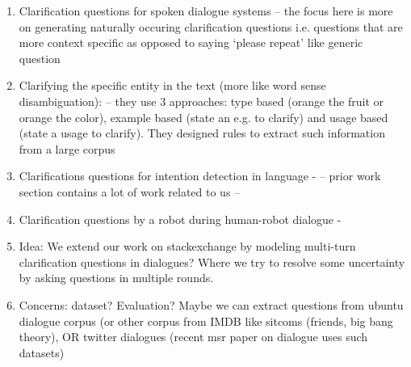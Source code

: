 \documentclass[11pt]{article}
\begin{document}
\begin{enumerate}
\item Clarification questions for spoken dialogue systems  -- the focus here is more on generating naturally occuring clarification questions i.e. questions that are more context specific as opposed to saying ‘please repeat’ like generic question %
\item Clarifying the specific entity in the text (more like word sense disambiguation): %
 -- they use 3 approaches: type based (orange the fruit or orange the color), example based (state an e.g. to clarify) and usage based (state a usage to clarify). They designed rules to extract such information from a large corpus
\item Clarifications questions for intention detection in language - %
--  prior work section contains a lot of work related to us -- 
\item Clarification questions by a robot during human-robot dialogue - %
\item Idea: We extend our work on stackexchange by modeling multi-turn clarification questions in dialogues? Where we try to resolve some uncertainty by asking questions in multiple rounds. 
\item Concerns: dataset? Evaluation? Maybe we can extract questions from ubuntu dialogue corpus (or other corpus from IMDB like sitcoms (friends, big bang theory), OR twitter dialogues (recent msr paper on dialogue uses such datasets) %
\end{enumerate}
\end{document}
